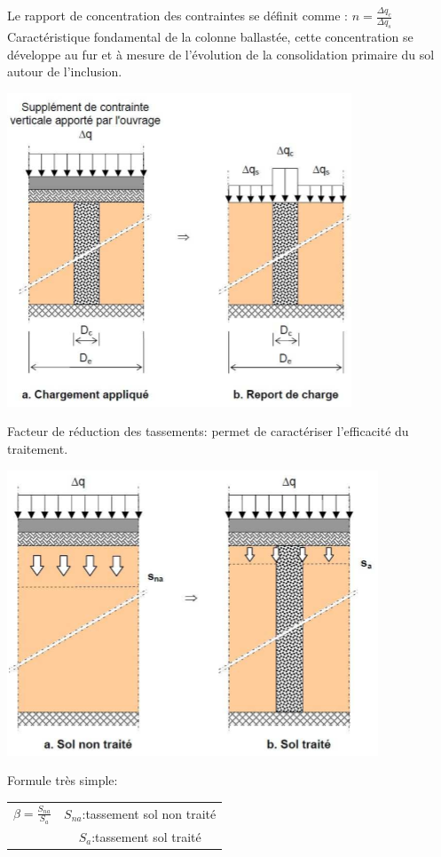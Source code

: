 Le rapport de concentration des contraintes se définit comme : $n = \frac{\Delta q_c}{\Delta q_s}$ Caractéristique fondamental de la colonne ballastée, cette concentration se développe au fur et à mesure de l'évolution de la consolidation primaire du sol autour de l'inclusion.

\begin{center}
\includegraphics [scale=0.5]{pictures/27.PNG}
\end{center}

\medskip

Facteur de réduction des tassements: permet de caractériser l'efficacité du traitement.

\begin{center}
\includegraphics [scale=0.5]{pictures/28.PNG}
\end{center}

Formule très simple:
\begin{center}
\begin{tabular}{c|c}
    $\beta = \frac{S_{na}}{S_a}$    & $S_{na}$:tassement sol non traité \\
                                    & $S_a$:tassement sol traité 
\end{tabular}
\end{center}

